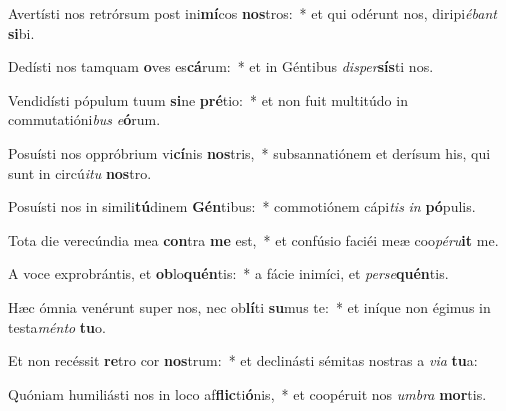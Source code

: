 \item Avertísti nos retrórsum post ini\textbf{mí}cos \textbf{nos}tros:~* et qui odérunt nos, diripi\textit{é}\textit{bant} \textbf{si}bi.
\item Dedísti nos tamquam \textbf{o}ves es\textbf{cá}rum:~* et in Géntibus \textit{di}\textit{sper}\textbf{sís}ti nos.
\item Vendidísti pópulum tuum \textbf{si}ne \textbf{pré}tio:~* et non fuit multitúdo in commutatióni\textit{bus} \textit{e}\textbf{ó}rum.
\item Posuísti nos oppróbrium vi\textbf{cí}nis \textbf{nos}tris,~* subsannatiónem et derísum his, qui sunt in circú\textit{i}\textit{tu} \textbf{nos}tro.
\item Posuísti nos in simili\textbf{tú}dinem \textbf{Gén}tibus:~* commotiónem cápi\textit{tis} \textit{in} \textbf{pó}pulis.
\item Tota die verecúndia mea \textbf{con}tra \textbf{me} est,~* et confúsio faciéi meæ coo\textit{pé}\textit{ru}\textbf{it} me.
\item A voce exprobrántis, et \textbf{ob}lo\textbf{quén}tis:~* a fácie inimíci, et \textit{per}\textit{se}\textbf{quén}tis.
\item Hæc ómnia venérunt super nos, nec ob\textbf{lí}ti \textbf{su}mus te:~* et iníque non égimus in testa\textit{mén}\textit{to} \textbf{tu}o.
\item Et non recéssit \textbf{re}tro cor \textbf{nos}trum:~* et declinásti sémitas nostras a \textit{vi}\textit{a} \textbf{tu}a:
\item Quóniam humiliásti nos in loco af\textbf{flic}ti\textbf{ó}nis,~* et coopéruit nos \textit{um}\textit{bra} \textbf{mor}tis.
